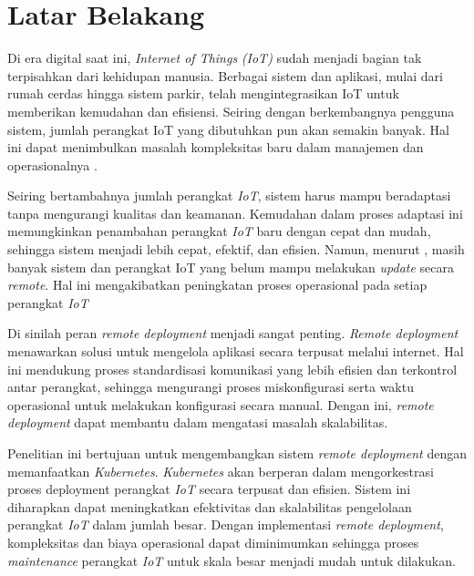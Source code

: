 \section{Latar Belakang}
\label{sec:latar-belakang}

Di era digital saat ini, \textit{Internet of Things} \textit{(IoT)} sudah menjadi bagian tak terpisahkan dari kehidupan manusia. Berbagai sistem dan aplikasi, mulai dari rumah cerdas hingga sistem parkir, telah mengintegrasikan IoT untuk memberikan kemudahan dan efisiensi. Seiring dengan berkembangnya pengguna sistem, jumlah perangkat IoT yang dibutuhkan pun akan semakin banyak. Hal ini dapat menimbulkan masalah kompleksitas baru dalam manajemen dan operasionalnya \parencite{IOTSmartCity}.

Seiring bertambahnya jumlah perangkat \textit{IoT}, sistem harus mampu beradaptasi tanpa mengurangi kualitas dan keamanan. Kemudahan dalam proses adaptasi ini memungkinkan penambahan perangkat \textit{IoT} baru dengan cepat dan mudah, sehingga sistem menjadi lebih cepat, efektif, dan efisien. Namun, menurut \parencite{RemoteDeployment}, masih banyak sistem dan perangkat IoT yang belum mampu melakukan \textit{update} secara \textit{remote}. Hal ini mengakibatkan peningkatan proses operasional pada setiap perangkat \textit{IoT}

Di sinilah peran \textit{remote deployment} menjadi sangat penting. \textit{Remote deployment} menawarkan solusi untuk mengelola aplikasi secara terpusat melalui internet. Hal ini mendukung proses standardisasi komunikasi yang lebih efisien dan terkontrol antar perangkat, sehingga mengurangi proses miskonfigurasi serta waktu operasional untuk melakukan konfigurasi secara manual. Dengan ini, \textit{remote deployment} dapat membantu dalam mengatasi masalah skalabilitas.

Penelitian ini bertujuan untuk mengembangkan sistem \textit{remote deployment} dengan memanfaatkan \textit{Kubernetes}. \textit{Kubernetes} akan berperan dalam mengorkestrasi proses deployment perangkat \textit{IoT} secara terpusat dan efisien. Sistem ini diharapkan dapat meningkatkan efektivitas dan skalabilitas pengelolaan perangkat \textit{IoT} dalam jumlah besar. Dengan implementasi \textit{remote deployment}, kompleksitas dan biaya operasional dapat diminimumkan sehingga proses \textit{maintenance} perangkat \textit{IoT} untuk skala besar menjadi mudah untuk dilakukan.